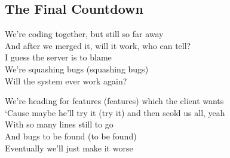 \subsection{The Final Countdown}

 We’re coding together, but still so far away \\
 And after we merged it, will it work, who can tell? \\
 I guess the server is to blame \\
 We’re squashing bugs (squashing bugs) \\
Will the system ever work again? \\


We’re heading for features (features) which the client wants \\
‘Cause maybe he’ll try it (try it) and then scold us all, yeah \\
With so many lines still to go \\
And bugs to be found (to be found) \\
Eventually we’ll just make it worse \\



\pagebreak

